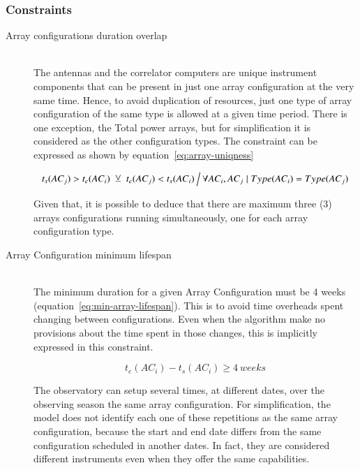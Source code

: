 \subsubsection{Constraints}
\begin{description}
\item[Array configurations duration overlap] \hfill \\
The antennas and the correlator computers are unique instrument components that can be present in just one array configuration at the very same time. Hence, to avoid duplication of resources, just one type of array configuration of the same type is allowed at a given time period. There is one exception, the Total power arrays, but for simplification it is considered as the other configuration types. The constraint can be expressed as shown by equation~\ref{eq:array-uniqness}

\begin{equation}
\label{eq:array-uniqness}
t_s(AC_j) > t_e(AC_i)\; \veebar \; t_e(AC_j) < t_s(AC_i) \:
\Big\slash \: \forall AC_i, AC_j \mid Type(AC_i) = Type(AC_j)
\end{equation}

Given that, it is possible to deduce that there are maximum three (3) arrays configurations running simultaneously, one for each array configuration type.

\item[Array Configuration minimum lifespan] \hfill \\
The minimum duration for a given Array Configuration must be 4 weeks (equation~\ref{eq:min-array-lifespan}). This is to avoid time overheads spent changing between configurations. Even when the algorithm make no provisions about the time spent in those changes, this is implicitly expressed in this constraint.

\begin{equation}
\label{eq:min-array-lifespan}
t_e(AC_i) - t_s(AC_i) \geq 4\:weeks
\end{equation}

The observatory can setup several times, at different dates, over the observing season the same array configuration. For simplification, the model does not identify each one of these repetitions as the same array configuration, because the start and end date differs from the same configuration scheduled in another dates. In fact, they are considered different instruments even when they offer the same capabilities.

\end{description}

